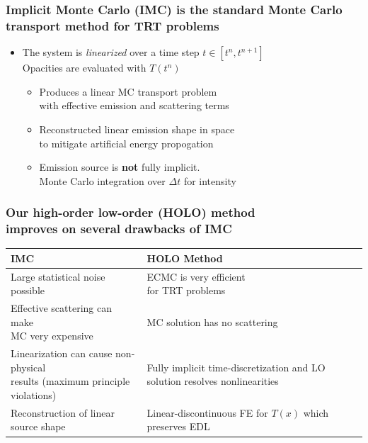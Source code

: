 \documentclass[xcolor=dvipsnames,hyperref={pdfpagelabels=false},unknownkeysallowed]{beamer}
\newcommand{\colb}[1]{{\color{blue} #1}}
\newcommand{\colG}[1]{{\color{Gray!110} #1}}
\newcommand{\colr}[1]{{\color{red} #1}}
\newlength{\wideitemsep}
\newlength{\tabsep}
\let\olditem\item
\renewcommand{\item}{\setlength{\itemsep}{\wideitemsep}\olditem}
\begin{document}
\begin{frame}
    \frametitle{Implicit Monte Carlo (IMC) is the standard Monte Carlo transport method for TRT problems}
        \vspace{-0.2in}
\begin{itemize}
    \item[] The system is \emph{linearized} over a time step $t\in[t^n,t^{n+1}]$ \\ 
        \colG{Opacities are evaluated with $T(t^n)$}\vspace{0.1in}
\setlength\wideitemsep{0.2in}
    \begin{itemize}
        \item Produces a linear MC transport problem 
               \\ \colG{with effective emission and scattering terms}
        \item Reconstructed linear emission shape in space
            \\ \colG{to mitigate artificial energy propogation} 
        \item Emission source is \textbf{not} fully implicit.\\
            \colG{Monte Carlo integration over $\Delta t$ for intensity}
    \end{itemize}
\end{itemize}
\end{frame}

\begin{frame}
    \frametitle{Our high-order low-order (HOLO) method \\improves on several drawbacks of IMC}
    \begin{center}
{\footnotesize
\begin{tabular}{p{} p{}} 
    \multicolumn{1}{l}{\textbf{\normalsize  IMC}} & \multicolumn{1}{l}{\textbf{\normalsize
    HOLO Method}} \\ \hline [2pt]
    \parbox{0.4\textwidth}{Large \colr{statistical noise} possible} & 
    \parbox{0.4\textwidth}{ECMC is very efficient \\for TRT problems} \\ [\tabsep]
 \parbox{0.4\textwidth}{{\color{red}Effective scattering} can make \\ MC  very expensive}
 & \parbox{0.4\textwidth}{MC solution has \colb{no
 scattering}} \\[\tabsep] 
 \parbox{0.5\textwidth}{Linearization can cause \colr{non-physical}\\ results  (maximum principle
 violations)} & \parbox{0.5\textwidth}{Fully \colb{implicit} time-discretization
 and LO solution \colb{resolves nonlinearities}} \\[\tabsep] 
 \parbox{0.5\textwidth}{\colG{Reconstruction of linear source shape}} &
 \parbox{0.5\textwidth}{Linear-discontinuous FE for $T(x)$ \\ which preserves EDL} 
\end{tabular}
}
\end{center}
\end{frame}
\end{document}
